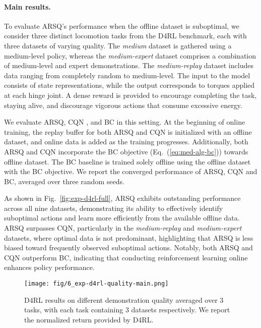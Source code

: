 \paragraph{Main results.}
To evaluate ARSQ's performance when the offline dataset is suboptimal, we consider three distinct locomotion tasks from the D4RL benchmark, each with three datasets of varying quality. 
The \textit{medium} dataset is gathered using a medium-level policy, whereas the \textit{medium-expert} dataset comprises a combination of medium-level and expert demonstrations. The \textit{medium-replay} dataset includes data ranging from completely random to medium-level.
The input to the model consists of state representations, while the output corresponds to torques applied at each hinge joint. 
A dense reward is provided to encourage completing the task, staying alive, and discourage vigorous actions that consume excessive energy.

We evaluate ARSQ, CQN \cite{CQN}, and BC in this setting.
At the beginning of online training, the replay buffer for both ARSQ and CQN is initialized with an offline dataset, and online data is added as the training progresses.
Additionally, both ARSQ and CQN incorporate the BC objective (Eq.~(\ref{eq:med-alg-bc})) towards offline dataset.
The BC baseline is trained solely offline using the offline dataset with the BC objective.
We report the converged performance of ARSQ, CQN and BC, averaged over three random seeds. 

As shown in Fig.~\ref{fig:exp-d4rl-full}, ARSQ exhibits outstanding performance across all nine datasets, demonstrating its ability to effectively identify suboptimal actions and learn more efficiently from the available offline data. 
ARSQ surpasses CQN, particularly in the \textit{medium-replay} and \textit{medium-expert} datasets, where optimal data is not predominant, highlighting that ARSQ is less biased toward frequently observed suboptimal actions. 
Notably, both ARSQ and CQN outperform BC, indicating that conducting reinforcement learning online enhances policy performance.

\begin{figure}[ht]
    \centering
    \texttt{[image: fig/6\_exp-d4rl-quality-main.png]}
    \vspace{-1em}
    \caption{D4RL results on different demonstration quality averaged over 3 tasks, with each task containing 3 datasets respectively. We report the normalized return provided by D4RL.}
    \label{fig:exp-d4rl-quality-main}
    \vspace{-3mm}
\end{figure}
